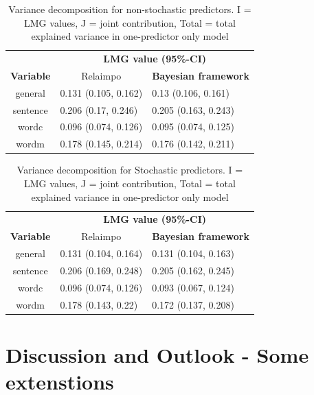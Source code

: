 \documentclass[11pt,a4paper,twoside]{book}\usepackage[]{graphicx}\usepackage[]{color}
\begin{document}
\begin{table}[h]
\caption{Variance decomposition for non-stochastic predictors. I = LMG values, J = joint contribution, Total = total explained variance in one-predictor only model}
\centering
\begin{tabular}{cll}
   \toprule
   &\multicolumn{2}{c}{\textbf{LMG value (95\%-CI)}} \\
 \textbf{Variable} & \multicolumn{1}{c}{Relaimpo} & \textbf{Bayesian framework}  \\
  \hline
general & 0.131 (0.105, 0.162)  & 0.13 (0.106, 0.161)  \\ 
sentence & 0.206 (0.17, 0.246)  & 0.205 (0.163, 0.243)   \\ 
wordc & 0.096 (0.074, 0.126)  & 0.095 (0.074, 0.125)  \\ 
wordm & 0.178 (0.145, 0.214) & 0.176 (0.142, 0.211)  \\ 
   \bottomrule
\end{tabular}
\label{tbl:empirical.relaimp.comp}
\end{table}





\begin{table}[h]
\caption{Variance decomposition for Stochastic predictors. I = LMG values, J = joint contribution, Total = total explained variance in one-predictor only model}
\centering
\begin{tabular}{cll}
   \toprule
   &\multicolumn{2}{c}{\textbf{LMG value (95\%-CI)}} \\
 \textbf{Variable} & \multicolumn{1}{c}{Relaimpo} & \textbf{Bayesian framework}  \\
  \hline
general & 0.131 (0.104, 0.164)  &  0.131 (0.104, 0.163)  \\ 
sentence & 0.206 (0.169, 0.248)  &  0.205 (0.162, 0.245)   \\ 
wordc & 0.096 (0.074, 0.126)  &  0.093 (0.067, 0.124)  \\ 
wordm & 0.178 (0.143, 0.22) &  0.172 (0.137, 0.208) \\ 
   \bottomrule
\end{tabular}
\label{tbl:empirical.relaimp.comp.stoch}
\end{table}







\chapter{Discussion and Outlook - Some extenstions}
\end{document}
